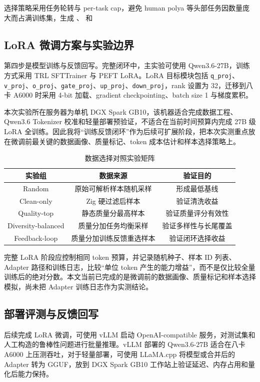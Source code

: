 \documentclass{article}
\begin{document}
选择策略采用任务轮转与 per-task cap，避免 human polya 等头部任务因数量庞大而占满训练集，生成 、 和 



\subsection{LoRA 微调方案与实验边界}
第四步是模型训练与反馈回写。完整闭环中，主实验可使用 Qwen3.6-27B，训练方式采用 TRL SFTTrainer 与 PEFT LoRA。LoRA 目标模块包括 \texttt{q\_proj}、\texttt{v\_proj}、\texttt{o\_proj}、\texttt{gate\_proj}、\texttt{up\_proj}、\texttt{down\_proj}，rank 设置为 32，迁移到八卡 A6000 时采用 4-bit 加载、gradient checkpointing、batch size 1 与梯度累积。

本次实验所在服务器为单机 DGX Spark GB10，该机器适合完成数据工程、Qwen3.6 Tokenizer 校准和轻量部署预验证，不适合在当前时间预算内完成 27B 级 LoRA 全训练。因此我将“训练反馈闭环”作为后续可扩展阶段，把本次实测重点放在微调前最关键的数据画像、质量标记、token 成本估计和样本选择策略上。

\begin{table}[H]
    \centering
    \renewcommand{\arraystretch}{1.2}
    \setlength{\tabcolsep}{12pt}
    \caption{数据选择对照实验矩阵}
    \begin{tabular}{ccc}
        \bottomrule[1.5pt]
        实验组 & 数据来源 & 验证目的 \\
        \midrule[0.75pt]
        Random & 原始可解析样本随机采样 & 形成最低基线 \\
        Clean-only & Zig 硬过滤后样本 & 验证清洗收益 \\
        Quality-top & 静态质量分最高样本 & 验证质量评分有效性 \\
        Diversity-balanced & 质量分加任务均衡采样 & 验证多样性与长尾覆盖 \\
        Feedback-loop & 质量分加训练反馈重选样本 & 验证闭环选择收益 \\
        \toprule[1.5pt]
    \end{tabular}
\end{table}

完整 LoRA 阶段应控制相同 token 预算，并记录随机种子、样本 ID 列表、Adapter 路径和训练日志，比较“单位 token 产生的能力增益”，而不是仅比较全量训练后的绝对分数。本文当前已完成的是微调前的数据画像、质量标记和样本选择模拟，尚未把 Adapter 训练日志作为实测结论。



\subsection{部署评测与反馈回写}
后续完成 LoRA 微调，可使用 vLLM 启动 OpenAI-compatible 服务，对测试集和人工构造的鲁棒性问题进行批量推理。vLLM 部署的 Qwen3.6-27B 适合在八卡 A6000 上压测吞吐，对于轻量部署，可使用 LLaMA.cpp 将模型或合并后的 Adapter 转为 GGUF，放到 DGX Spark GB10 工作站上验证延迟、内存占用和量化后能力保持。
\end{document}
